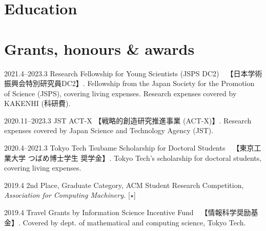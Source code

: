 \documentclass[11pt]{article} %
\newcommand{\伊澤侑祐}{\underline{伊澤侑祐}}
\begin{document}





\section*{Education}




\section*{Grants, honours \& awards}

\grant
{2021.4--2023.3}
{Research Fellowship for Young Scientists (JSPS DC2)~~【日本学術振興会特別研究員DC2】.}
{Fellowship from the Japan Society for the Promotion of Science (JSPS), covering
  living expenses. Research expenses covered by KAKENHI (科研費).}

\grant
{2020.11--2023.3}
{JST ACT-X 【戦略的創造研究推進事業 (ACT-X)】.}
{Research expenses covered by Japan Science and Technology Agency (JST).}

\grant
{2020.4--2021.3}
{Tokyo Tech Tsubame Scholarship for Doctoral Students~~【東京工業大学 つばめ博士学生
  奨学金】.}
{Tokyo Tech's scholarship for doctoral students, covering living expenses.}

\grant
{2019.4}
{2nd Place, Graduate Category, ACM Student Research Competition, \textit{Association for Computing Machinery.}
  [$\star$]}
{}

\grant
{2019.4}
{Travel Grants by Information Science Incentive Fund~~【情報科学奨励基金】.}
{Covered by dept. of mathematical and computing science, Tokyo Tech.}
\end{document}
